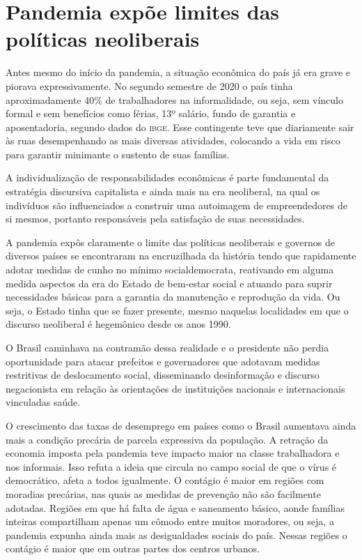 \section{Pandemia expõe limites das políticas neoliberais}

Antes mesmo do início da pandemia, a situação econômica do país já era
grave e piorava expressivamente. No segundo semestre de 2020 o país
tinha aproximadamente 40\% de trabalhadores na informalidade, ou seja,
sem vínculo formal e sem benefícios como férias, 13º salário, fundo de
garantia e aposentadoria, segundo dados do \textsc{\textsc{ibge}}. Esse contingente teve que diariamente
sair às ruas desempenhando as mais diversas atividades, colocando a vida
em risco para garantir minimante o sustento de suas famílias.

A individualização de responsabilidades econômicas é parte fundamental
da estratégia discursiva capitalista e ainda mais na era neoliberal, na
qual os indivíduos são influenciados a construir uma autoimagem de
empreendedores de si mesmos, portanto responsáveis pela satisfação de
suas necessidades.

A pandemia expôs claramente o limite das políticas neoliberais e
governos de diversos países se encontraram na encruzilhada da história
tendo que rapidamente adotar medidas de cunho no mínimo socialdemocrata,
reativando em alguma medida aspectos da era do Estado de bem-estar
social e atuando para suprir necessidades básicas para a garantia da
manutenção e reprodução da vida. Ou seja, o Estado tinha que se fazer
presente, mesmo naquelas localidades em que o discurso neoliberal é
hegemônico desde os anos 1990.

O Brasil caminhava na contramão dessa realidade e o presidente não
perdia oportunidade para atacar prefeitos e governadores que adotavam
medidas restritivas de deslocamento social, disseminando desinformação e
discurso negacionista em relação às orientações de instituições
nacionais e internacionais vinculadas saúde.

O crescimento das taxas de desemprego em países como o Brasil aumentava
ainda mais a condição precária de parcela expressiva da população. A
retração da economia imposta pela pandemia teve impacto maior na classe
trabalhadora e nos informais. Isso refuta a ideia que circula no campo
social de que o vírus é democrático, afeta a todos igualmente. O
contágio é maior em regiões com moradias precárias, nas quais as medidas
de prevenção não são facilmente adotadas. Regiões em que há falta de
água e saneamento básico, aonde famílias inteiras compartilham apenas um
cômodo entre muitos moradores, ou seja, a pandemia expunha ainda mais as
desigualdades sociais do país. Nessas regiões o contágio é maior que em
outras partes dos centros urbanos.

